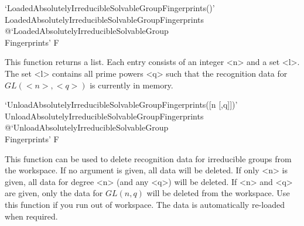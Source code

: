 \>`LoadedAbsolutelyIrreducibleSolvableGroupFingerprints()'%
{LoadedAbsolutelyIrreducibleSolvableGroupFingerprints}%
@{`LoadedAbsolutelyIrreducibleSolvableGroup\\Fingerprints'} F

This function returns a list. Each entry consists of an integer <n> and a set <l>. The set
<l> contains all prime powers <q> such that the recognition data for $GL(<n>, <q>)$ is currently in
memory.

\>`UnloadAbsolutelyIrreducibleSolvableGroupFingerprints([n [,q]])'%
{UnloadAbsolutelyIrreducibleSolvableGroupFingerprints}%
@{`UnloadAbsolutelyIrreducibleSolvableGroup\\Fingerprints'} F

This function can be used to delete recognition data for irreducible groups from the {\GAP} workspace. If no
argument is given, all data will be deleted. If only <n> is given, all data for degree <n> (and any
<q>) will be deleted. If <n> and <q> are given, only the data for $GL(n, q)$ will be deleted from the
{\GAP} workspace. Use this function if you run out of {\GAP} workspace. The
data is automatically re-loaded when required.



